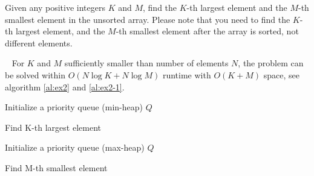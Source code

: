 \begin{exercise}[]{Given any positive integers $K$ and $M$, find the $K$-th largest element and the $M$-th smallest element in the unsorted array. Please note that you need to find the $K$-th largest element, and the $M$-th smallest element after the array is sorted, not different elements.}
  \begin{solution}
  \par{~} For $K$ and $M$ sufficiently smaller than number of elements $N$, the problem can be solved within $O(N \log K + N \log M)$ runtime with $O(K+M)$ space, see algorithm \ref{al:ex2} and \ref{al:ex2-1}.

  \begin{algorithm}[H]
    \BlankLine
    Initialize a priority queue (min-heap) $Q$ \;
    \caption{Find K-th largest element \label{al:ex2}}
  \end{algorithm}

  \begin{algorithm}[H]
    \BlankLine
    Initialize a priority queue (max-heap) $Q$ \;
    \caption{Find M-th smallest element \label{al:ex2-1}}
  \end{algorithm}
  \end{solution}
  \label{ex2}
\end{exercise}



